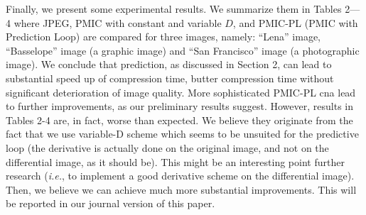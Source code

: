 \documentclass[11pt,a4paper]{article}
\newcommand{\ie}{{\em i.e.}}
\begin{document}
Finally, we present some experimental results. We summarize them in Tables
2---4 where JPEG, PMIC with constant and variable $D$, and PMIC-PL (PMIC
with Prediction Loop) are compared for three images, namely: ``Lena''
image, ``Basselope'' image (a graphic image) and ``San Francisco'' image (a
photographic image).  We conclude that prediction, as discussed in Section
2, can lead to substantial speed up of compression time, butter compression
time without significant deterioration of image quality. More sophisticated
PMIC-PL cna lead to further improvements, as our preliminary results
suggest. However, results in Tables 2-4 are, in fact, worse than
expected. We believe they originate from the fact that we use variable-D
scheme which seems to be unsuited for the predictive loop (the derivative
is actually done on the original image, and not on the differential image,
as it should be). This might be an interesting point further research
(\ie, to implement a good derivative scheme on the differential image).
Then, we believe we can achieve much more substantial improvements. This
will be reported in our journal version of this paper.

\small
\end{document}
